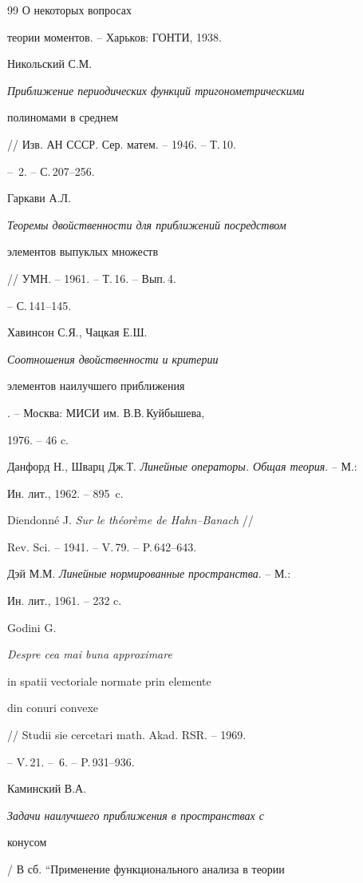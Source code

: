 \begin{thebibliography}{99}
О некоторых вопросах 


теории моментов. -- Харьков: ГОНТИ, 1938. 




Никольский С.М. {\em Приближение периодических функций тригонометрическими 


полиномами в среднем} // Изв. АН СССР. Сер. матем. -- 1946. -- Т.\,10. 


-- \No\,2. -- С.\,207--256. 




Гаркави А.Л. {\em Теоремы двойственности для приближений посредством 


элементов выпуклых множеств} // УМН. -- 1961. -- Т.\,16. -- Вып.\,4. 


-- С.\,141--145. 




Хавинсон С.Я., Чацкая Е.Ш. {\em Соотношения двойственности и критерии 


элементов наилучшего приближения}. -- Москва: МИСИ им. В.В.\,Куйбышева, 


1976. -- 46 c. 




Данфорд Н., Шварц Дж.Т. {\em Линейные операторы. Общая теория}. -- М.: 


Ин. лит., 1962. -- 895~c. 




Diendonn\'e J. {\em Sur le th\'eor\`eme de Hahn--Banach} // 


Rev. Sci. -- 1941. -- V.\,79. -- P.\,642--643. 




Дэй М.М. {\em Линейные нормированные пространства}. -- М.: 


Ин. лит., 1961. -- 232 c. 




Godini G. {\em Despre cea mai buna approximare 


in spatii vectoriale normate prin elemente 


din conuri convexe} // Studii sie cercetari math. Akad. RSR. -- 1969. 


-- V.\,21. -- \No\,6. -- P.\,931--936. 




Каминский В.А. {\em Задачи наилучшего приближения в пространствах с 


конусом} / В сб. ``Применение функционального анализа в теории 



\end{thebibliography}
